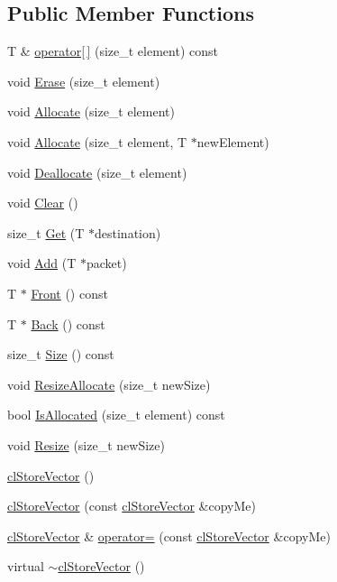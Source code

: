\subsection*{Public Member Functions}
\begin{DoxyCompactItemize}
\item 
T \& \hyperlink{classcl_store_vector_a00f7e944c4ea8aaa6b865a0e15f08f0d}{operator\mbox{[}$\,$\mbox{]}} (size\_\-t element) const 
\item 
void \hyperlink{classcl_store_vector_ae464006a681b8e9bca7e140492c947bc}{Erase} (size\_\-t element)
\item 
void \hyperlink{classcl_store_vector_aee32fc9965865aa5f326e444d40d59f6}{Allocate} (size\_\-t element)
\item 
void \hyperlink{classcl_store_vector_a0ff5ee425a1b9999ef22c61b4e08be7f}{Allocate} (size\_\-t element, T $\ast$newElement)
\item 
void \hyperlink{classcl_store_vector_af236e940f7d86cfa77ded405ab9c1432}{Deallocate} (size\_\-t element)
\item 
void \hyperlink{classcl_store_vector_a595378c675306da1b01ff56ca3d18641}{Clear} ()
\item 
size\_\-t \hyperlink{classcl_store_vector_ac57b7e98ceab1667a860d618c4cb393c}{Get} (T $\ast$destination)
\item 
void \hyperlink{classcl_store_vector_a188db95bf01f9fec77d9a47b792496b7}{Add} (T $\ast$packet)
\item 
T $\ast$ \hyperlink{classcl_store_vector_afa3b431e252579cc5b63c4f96c245395}{Front} () const 
\item 
T $\ast$ \hyperlink{classcl_store_vector_a57a073ce41e75bd94c839dec7583d494}{Back} () const 
\item 
size\_\-t \hyperlink{classcl_store_vector_a509567b8c36947d03a05affc5f04d1c4}{Size} () const 
\item 
void \hyperlink{classcl_store_vector_a627defda478c079720527a35d46c903f}{ResizeAllocate} (size\_\-t newSize)
\item 
bool \hyperlink{classcl_store_vector_a16b3443011d7aac2dbb904e684f57839}{IsAllocated} (size\_\-t element) const 
\item 
void \hyperlink{classcl_store_vector_a800c49331e0643cde27e18560baeaa1e}{Resize} (size\_\-t newSize)
\item 
\hyperlink{classcl_store_vector_a16c0fcb7530d9553d04d337cfd7d0905}{clStoreVector} ()
\item 
\hyperlink{classcl_store_vector_afab0ca5d22471967512e9c7659fc24c7}{clStoreVector} (const \hyperlink{classcl_store_vector}{clStoreVector} \&copyMe)
\item 
\hyperlink{classcl_store_vector}{clStoreVector} \& \hyperlink{classcl_store_vector_af0cf98773406741bf47b194132b4c3f7}{operator=} (const \hyperlink{classcl_store_vector}{clStoreVector} \&copyMe)
\item 
virtual \hyperlink{classcl_store_vector_a8975190ba0f04d408686d82723d08adf}{$\sim$clStoreVector} ()
\end{DoxyCompactItemize}
